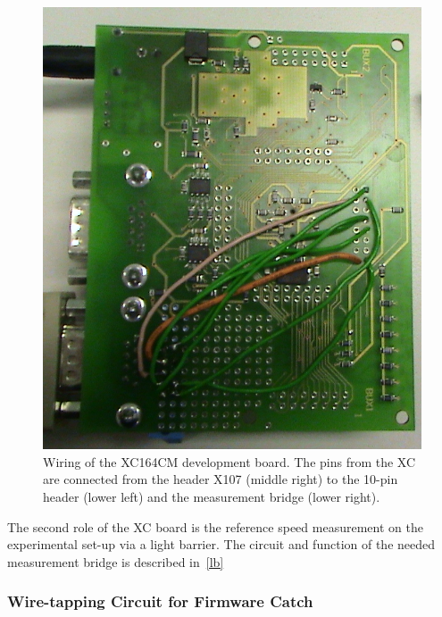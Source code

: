 \documentclass[12pt,a4paper]{article}
\begin{document}
\begin{figure}[htbp]
\begin{center}
\includegraphics[width=0.5\columnwidth]{figures/boardwiring.png}
\caption{\label{fig:boardwiring}
Wiring of the XC164CM development board.
The pins from the XC are connected from the header X107 (middle right) to the 10-pin header (lower left) and the measurement bridge (lower right).
}
\end{center}
\end{figure}


The second role of the XC board is the reference speed measurement on the experimental set-up via a light barrier.
The circuit and function of the needed measurement bridge is described in~\autoref{lb}






    


\subsubsection{Wire-tapping Circuit for Firmware Catch}

\end{document}
